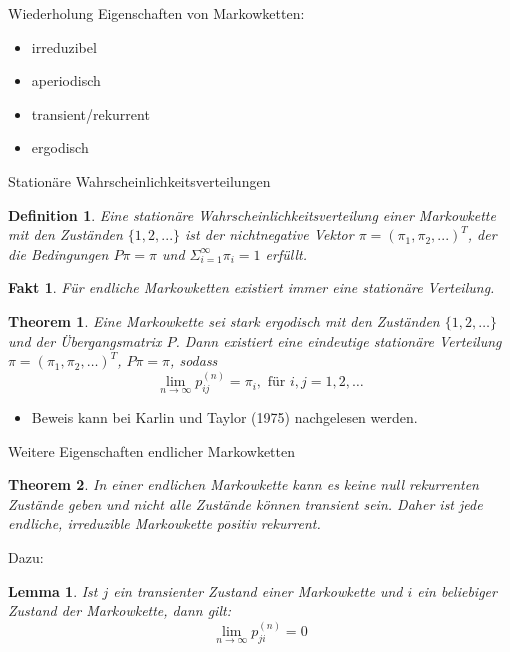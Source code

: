 \documentclass{beamer}
\newtheorem{defi}{Definition}
\newtheorem{thm}{Theorem}
\newtheorem{lmm}{Lemma}
\newtheorem{fct}{Fakt}
\begin{document}
\begin{frame}{Wiederholung}
  Eigenschaften von Markowketten:
  \begin{itemize}
  \item irreduzibel
  \item aperiodisch
  \item transient/rekurrent
  \item ergodisch
  \end{itemize}
\end{frame}
\begin{frame}{Stationäre Wahrscheinlichkeitsverteilungen}
  \begin{defi}
    Eine stationäre Wahrscheinlichkeitsverteilung einer Markowkette mit den Zuständen $\{1,2,...\}$   ist der nichtnegative Vektor $π = (π_1,π_2,...)^T$, der die Bedingungen $Pπ = π$ und $Σ_{i=1}^∞π_i = 1$ erfüllt.
  \end{defi}
  \begin{fct}
    Für endliche Markowketten existiert immer eine stationäre Verteilung.
  \end{fct}
\end{frame}
\begin{frame}
  \begin{thm}
    Eine Markowkette sei stark ergodisch mit den Zuständen
    $\{1,2,\dots\}$ und der Übergangsmatrix $P$. Dann existiert eine
    eindeutige stationäre Verteilung $π = (π_1,π_2,\dots)^T$, $Pπ = π$,
    sodass
    \[
      \lim_{n →∞}p_{ij}^{(n)} = π_i, \text{ für } i,j=1,2,\dots
    \]
  \end{thm}
  \begin{itemize}
    \item Beweis kann bei Karlin und Taylor (1975) nachgelesen werden.
  \end{itemize}
\end{frame}
\begin{frame}{Weitere Eigenschaften endlicher Markowketten}
  \begin{thm}
    In einer endlichen Markowkette kann es keine
    null rekurrenten Zustände geben und nicht alle Zustände
    können transient sein. Daher ist jede endliche, irreduzible Markowkette positiv
    rekurrent.  
  \end{thm}
  Dazu:
  \begin{lmm}
    Ist $j$ ein transienter Zustand einer Markowkette und $i$ ein
    beliebiger Zustand der Markowkette, dann gilt:
    \[
      \lim_{n→∞} p_{ji}^{(n)} = 0
    \]
  \end{lmm}
\end{frame}
\end{document}
